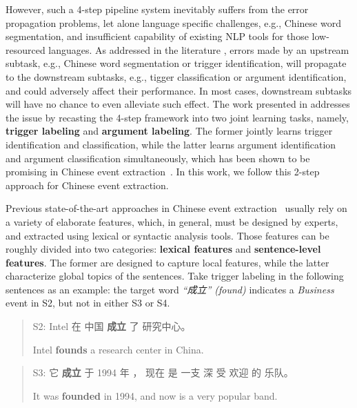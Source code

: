 However, such a 4-step pipeline system inevitably suffers from the error propagation problems, let alone language specific challenges,  e.g., Chinese word segmentation, and insufficient capability of existing NLP tools for those low-resourced languages.  As addressed in the literature \cite{chen2009language,li2012employing}, errors made by an upstream subtask, e.g., Chinese word segmentation or trigger identification,  will propagate to the downstream subtasks, e.g., tigger classification or argument identification, and could adversely affect their performance. In most cases, downstream subtasks will have no chance to even alleviate such effect. The work presented in \cite{chen2012joint} addresses the issue by recasting the 4-step framework  into two joint learning tasks, namely, \textbf{trigger labeling} and \textbf{argument labeling}. The  former jointly learns trigger identification and classification, while the latter learns argument identification and argument classification simultaneously, which has been shown to be promising in Chinese event extraction~\cite{chen2012joint}. In this work, we follow this 2-step approach for Chinese event extraction.


Previous state-of-the-art approaches in Chinese event extraction~\cite{chen2009language,li2012employing,chen2012joint,li2013joint} usually rely on a variety of elaborate features, which, in general, must be designed by experts, and extracted using lexical or syntactic analysis tools. Those features can be roughly divided into two categories: \textbf{lexical features} and \textbf{sentence-level features}. The former are designed to capture local features, while the latter characterize global topics of the sentences.  Take trigger labeling in the following sentences as an example: the target word \textit{``成立'' (found)} indicates a \emph{Business} event in S2, but not in either S3 or S4.

\begin{quote}
S2: Intel 在 中国 \textbf{成立} 了 研究中心。

\hspace{0.52cm} Intel \textbf{founds} a research center in China.
\end{quote}

\begin{quote}
S3: 它 \textbf{成立} 于 1994 年 ， 现在 是 一支 深 受 欢迎 的 乐队。

\hspace{0.52cm} It was \textbf{founded} in 1994, and now is a very popular band.
\end{quote}

